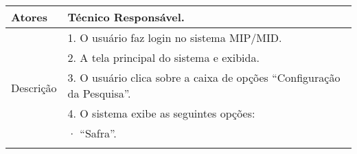 \begin{table}[!h]
\begin{tabular}{|l|l|}
Atores                                                   & Técnico Responsável.                                                                                                                                                                                                                                                                                                                                                                     \\ \hline
\multirow{8}{*}{Descrição}                               & 1. O usuário faz login no sistema MIP/MID.                                                                                                                                                                                                                                                                                                                                               \\ \cline{2-2} 
                                                         & 2. A tela principal do sistema e exibida.                                                                                                                                                                                                                                                                                                                                                \\ \cline{2-2} 
                                                         & 3. O usuário clica sobre a caixa de opções “Configuração da Pesquisa”.                                                                                                                                                                                                                                                                                                                   \\ \cline{2-2} 
                                                         & 4. O sistema exibe as seguintes opções:                                                                                                                                                                                                                                                                                                                                                  \\ \cline{2-2} 
                                                         & ·         “Safra”.                                                                                                                                                                                                                                                                                                                                                                       \\ \cline{2-2} 

\end{tabular}
\end{table}
